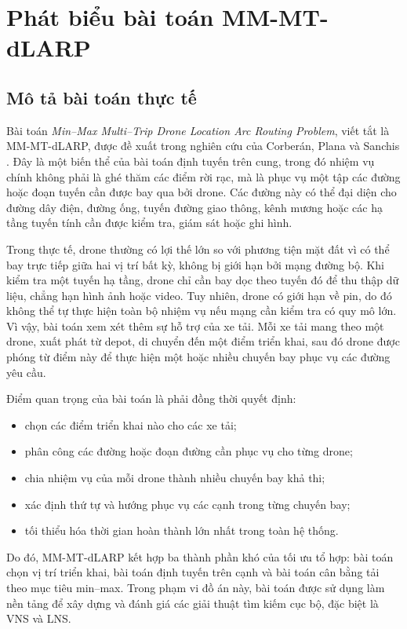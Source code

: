 \chapter{Phát biểu bài toán MM-MT-dLARP}
\label{chap:bai-toan}

\section{Mô tả bài toán thực tế}

Bài toán \textit{Min--Max Multi--Trip Drone Location Arc Routing Problem}, viết tắt là MM-MT-dLARP, được đề xuất trong nghiên cứu của Corberán, Plana và Sanchis \cite{corberan2025mmdlarp}. Đây là một biến thể của bài toán định tuyến trên cung, trong đó nhiệm vụ chính không phải là ghé thăm các điểm rời rạc, mà là phục vụ một tập các đường hoặc đoạn tuyến cần được bay qua bởi drone. Các đường này có thể đại diện cho đường dây điện, đường ống, tuyến đường giao thông, kênh mương hoặc các hạ tầng tuyến tính cần được kiểm tra, giám sát hoặc ghi hình.

Trong thực tế, drone thường có lợi thế lớn so với phương tiện mặt đất vì có thể bay trực tiếp giữa hai vị trí bất kỳ, không bị giới hạn bởi mạng đường bộ. Khi kiểm tra một tuyến hạ tầng, drone chỉ cần bay dọc theo tuyến đó để thu thập dữ liệu, chẳng hạn hình ảnh hoặc video. Tuy nhiên, drone có giới hạn về pin, do đó không thể tự thực hiện toàn bộ nhiệm vụ nếu mạng cần kiểm tra có quy mô lớn. Vì vậy, bài toán xem xét thêm sự hỗ trợ của xe tải. Mỗi xe tải mang theo một drone, xuất phát từ depot, di chuyển đến một điểm triển khai, sau đó drone được phóng từ điểm này để thực hiện một hoặc nhiều chuyến bay phục vụ các đường yêu cầu.

Điểm quan trọng của bài toán là phải đồng thời quyết định:
\begin{itemize}
\item chọn các điểm triển khai nào cho các xe tải;
\item phân công các đường hoặc đoạn đường cần phục vụ cho từng drone;
\item chia nhiệm vụ của mỗi drone thành nhiều chuyến bay khả thi;
\item xác định thứ tự và hướng phục vụ các cạnh trong từng chuyến bay;
\item tối thiểu hóa thời gian hoàn thành lớn nhất trong toàn hệ thống.
\end{itemize}

Do đó, MM-MT-dLARP kết hợp ba thành phần khó của tối ưu tổ hợp: bài toán chọn vị trí triển khai, bài toán định tuyến trên cạnh và bài toán cân bằng tải theo mục tiêu min--max. Trong phạm vi đồ án này, bài toán được sử dụng làm nền tảng để xây dựng và đánh giá các giải thuật tìm kiếm cục bộ, đặc biệt là VNS và LNS.

